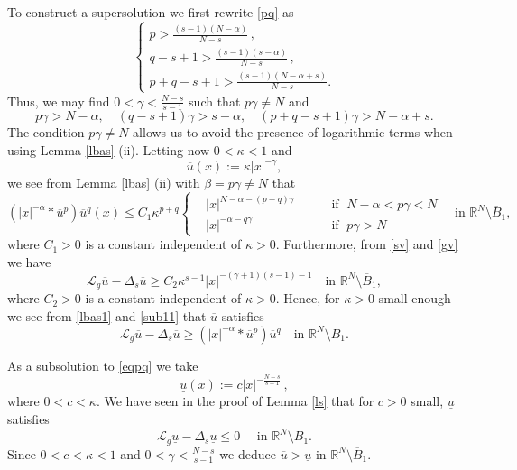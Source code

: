 \documentclass[leqno,12pt]{article}
\numberwithin{equation}{section}
\newcommand{\R}{\mathbb R}
\newcommand{\Ro}{\mathbb R^N\setminus \overline B_1}
\newcommand{\Lg}{{\mathcal L}_g}
\begin{document}
To construct a supersolution we first rewrite \eqref{pq} as
$$
\begin{cases}
\displaystyle p>\frac{(s-1)(N-\alpha)}{N-s}\, , \\[0.1in]
\displaystyle q-s+1>\frac{(s-1)(s-\alpha)}{N-s}\, , \\[0.1in]
\displaystyle p+q-s+1>\frac{(s-1)(N-\alpha+s)}{N-s}.
\end{cases}
$$
Thus, we may find $0<\gamma<\frac{N-s}{s-1}$ such that $p\gamma\neq N$ and
\begin{equation}\label{pqc}
p\gamma >N-\alpha, \quad 
(q-s+1)\gamma >s-\alpha, \quad
(p+q-s+1)\gamma>N-\alpha+s.
\end{equation}
The condition $p\gamma\neq N$ allows us to avoid the presence of logarithmic terms when using Lemma \ref{lbas} (ii). Letting now $0<\kappa<1$ and
\begin{equation}\label{sup1}
\overline u(x):=\kappa |x|^{-\gamma},
\end{equation} 
we see from Lemma \ref{lbas} (ii) with $\beta=p\gamma\neq N$  that
\begin{equation}\label{lbas1}
(|x|^{-\alpha}*\overline u^p)\overline u^q(x)\leq C_1 \kappa^{p+q}
\left\{
\begin{aligned}
& |x|^{N-\alpha-(p+q)\gamma} &&\quad\mbox{ if }\; N-\alpha<p\gamma<N\\[0.1in]
& |x|^{-\alpha-q\gamma} &&\quad\mbox{ if }\; p\gamma>N
\end{aligned}
\right.
\quad\mbox{in }\R^N\setminus \overline B_{1},
\end{equation}
where $C_1>0$ is a constant independent of $\kappa>0$.
Furthermore, from \eqref{sv} and \eqref{gv} we have 
\begin{equation}\label{sub11}
\Lg \overline u-\Delta_s \overline u\geq C_2\kappa^{s-1} |x|^{-(\gamma+1)(s-1)-1} 
\quad\mbox{in }\R^N\setminus \overline B_{1},
\end{equation}
where $C_2>0$ is a constant independent of $\kappa>0$. Hence, for $\kappa>0$ small enough we see from \eqref{lbas1} and \eqref{sub11} that $\overline u$ satisfies
$$
\Lg \overline u-\Delta_s \overline u\geq (|x|^{-\alpha}*\overline u^p)\overline u^q
\quad\mbox{in }\R^N\setminus \overline B_{1}.
$$

As a subsolution to \eqref{eqpq} we take
\begin{equation}\label{sub1}
\underline u(x):= c|x|^{-\frac{N-s}{s-1}}\, ,
\end{equation}
where $0<c<\kappa$. 
We have seen in the proof of Lemma \ref{ls} that for $c>0$ small, $\underline u$ satisfies
\begin{equation}
\Lg \underline u-\Delta_s \underline u\leq 0\quad\mbox{ in }\R^N\setminus\overline B_1.
\end{equation}
Since $0<c<\kappa<1$ and $0<\gamma<\frac{N-s}{s-1}$ we deduce $\overline u>\underline u$ in $\Ro$.
\end{document}
